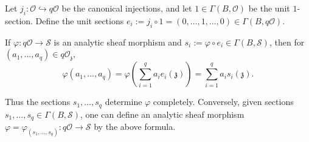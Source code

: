 Let $j_i: \mathcal{O} \hookrightarrow q\mathcal{O}$ be the canonical injections, and let $1 \in \Gamma(B, \mathcal{O})$ be the unit $1$-section. Define the unit sections $e_i := j_i \circ 1 = (0, \ldots, 1, \ldots, 0) \in \Gamma(B, q\mathcal{O})$.

If $\varphi: q\mathcal{O} \rightarrow \mathcal{S}$ is an analytic sheaf morphism and $s_i := \varphi \circ e_i \in \Gamma(B, \mathcal{S})$, then for $(a_1, \ldots, a_q) \in q\mathcal{O}_{\mathfrak{z}}$,
$$
\varphi(a_1, \ldots, a_q) = \varphi\left( \sum_{i=1}^{q} a_i e_i(\mathfrak{z}) \right) = \sum_{i=1}^{q} a_i s_i(\mathfrak{z}).
$$

Thus the sections $s_1, \ldots, s_q$ determine $\varphi$ completely. Conversely, given sections $s_1, \ldots, s_q \in \Gamma(B, \mathcal{S})$, one can define an analytic sheaf morphism $\varphi = \varphi_{(s_1, \ldots, s_q)}: q\mathcal{O} \to \mathcal{S}$ by the above formula.
